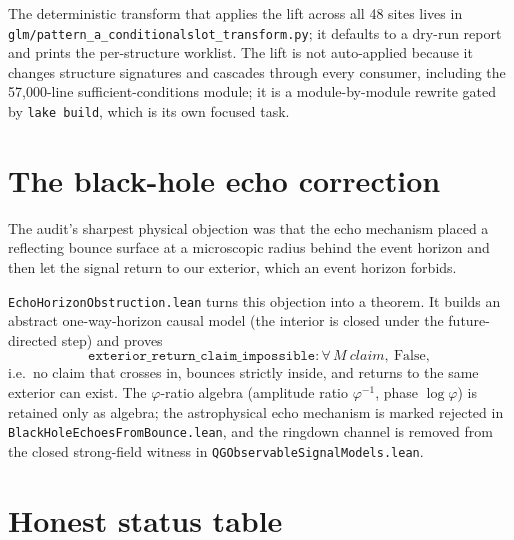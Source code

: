\documentclass[11pt,letterpaper]{article}
\newcommand{\lmod}[1]{\texttt{#1}}
\begin{document}
The deterministic transform that applies the lift across all 48 sites lives in
\lmod{glm/pattern\_a\_conditionalslot\_transform.py}; it defaults to a dry-run
report and prints the per-structure worklist. The lift is not auto-applied
because it changes structure signatures and cascades through every consumer,
including the 57{,}000-line sufficient-conditions module; it is a module-by-module
rewrite gated by \lmod{lake build}, which is its own focused task.

\section{The black-hole echo correction}
\label{sec:echo}

The audit's sharpest physical objection was that the echo mechanism placed a
reflecting bounce surface at a microscopic radius behind the event horizon and
then let the signal return to our exterior, which an event horizon forbids.

\lmod{EchoHorizonObstruction.lean} turns this objection into a theorem. It builds
an abstract one-way-horizon causal model (the interior is closed under the
future-directed step) and proves
\[
\texttt{exterior\_return\_claim\_impossible} : \forall\,M\ \mathit{claim},\ \mathrm{False},
\]
i.e.\ no claim that crosses in, bounces strictly inside, and returns to the same
exterior can exist. The $\varphi$-ratio algebra (amplitude ratio
$\varphi^{-1}$, phase $\log\varphi$) is retained only as algebra; the
astrophysical echo mechanism is marked rejected in
\lmod{BlackHoleEchoesFromBounce.lean}, and the ringdown channel is removed from the
closed strong-field witness in \lmod{QGObservableSignalModels.lean}.

\section{Honest status table}
\label{sec:status}
\end{document}
